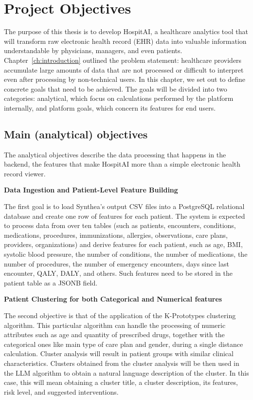 \chapter{Project Objectives}\label{ch:objectives}

The purpose of this thesis is to develop HospitAI, a healthcare analytics tool that will transform raw electronic health record (EHR) data into valuable information understandable by physicians, managers, and even patients. Chapter~\ref{ch:introduction} outlined the problem statement: healthcare providers accumulate large amounts of data that are not processed or difficult to interpret even after processing by non-technical users. In this chapter, we set out to define concrete goals that need to be achieved. The goals will be divided into two categories: analytical, which focus on calculations performed by the platform internally, and platform goals, which concern its features for end users.

\section{Main (analytical) objectives}

The analytical objectives describe the data processing that happens in the backend, the features that make HospitAI more than a simple electronic health record viewer.

\vspace{0.5em}
\noindent\textbf{Data Ingestion and Patient-Level Feature Building}

The first goal is to load Synthea's output CSV files into a PostgreSQL relational database and create one row of features for each patient. The system is expected to process data from over ten tables (such as patients, encounters, conditions, medications, procedures, immunizations, allergies, observations, care plans, providers, organizations) and derive features for each patient, such as age, BMI, systolic blood pressure, the number of conditions, the number of medications, the number of procedures, the number of emergency encounters, days since last encounter, QALY, DALY, and others. Such features need to be stored in the patient table as a JSONB field.

\vspace{0.5em}
\noindent\textbf{Patient Clustering for both Categorical and Numerical features}

The second objective is that of the application of the K-Prototypes clustering algorithm. This particular algorithm can handle the processing of numeric attributes such as age and quantity of prescribed drugs, together with the categorical ones like main type of care plan and gender, during a single distance calculation. Cluster analysis will result in patient groups with similar clinical characteristics. Clusters obtained from the cluster analysis will be then used in the LLM algorithm to obtain a natural language description of the cluster. In this case, this will mean obtaining a cluster title, a cluster description, its features, risk level, and suggested interventions.

